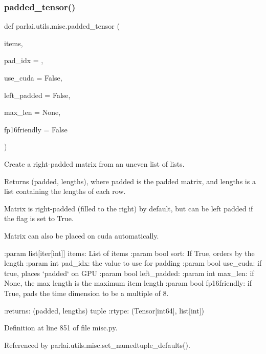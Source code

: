 \subsubsection{\texorpdfstring{padded\+\_\+tensor()}{padded\_tensor()}}
{\footnotesize\ttfamily def parlai.\+utils.\+misc.\+padded\+\_\+tensor (\begin{DoxyParamCaption}\item[{}]{items,  }\item[{}]{pad\+\_\+idx = {},  }\item[{}]{use\+\_\+cuda = {\ttfamily False},  }\item[{}]{left\+\_\+padded = {\ttfamily False},  }\item[{}]{max\+\_\+len = {\ttfamily None},  }\item[{}]{fp16friendly = {\ttfamily False} }\end{DoxyParamCaption})}

\begin{DoxyVerb}Create a right-padded matrix from an uneven list of lists.

Returns (padded, lengths), where padded is the padded matrix, and lengths
is a list containing the lengths of each row.

Matrix is right-padded (filled to the right) by default, but can be
left padded if the flag is set to True.

Matrix can also be placed on cuda automatically.

:param list[iter[int]] items: List of items
:param bool sort: If True, orders by the length
:param int pad_idx: the value to use for padding
:param bool use_cuda: if true, places `padded` on GPU
:param bool left_padded:
:param int max_len: if None, the max length is the maximum item length
:param bool fp16friendly: if True, pads the time dimension to be a multiple of 8.

:returns: (padded, lengths) tuple
:rtype: (Tensor[int64], list[int])
\end{DoxyVerb}
 

Definition at line 851 of file misc.\+py.



Referenced by parlai.\+utils.\+misc.\+set\+\_\+namedtuple\+\_\+defaults().


